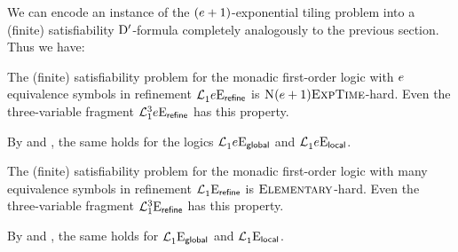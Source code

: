 We can encode an instance of the $(e+1)$-exponential tiling problem into a
(finite) satisfiability ${\mathrm{D'}}$-formula completely analogously to the previous
section. Thus we have:
\begin{proposition}
The (finite) satisfiability problem for the monadic first-order logic with
$e$ equivalence symbols in refinement $\mathcal{L}^{{}}_{1}{e}\mathrm{E}_{\mathsf{refine}}$ is
$\text{\normalfont{\scshape N}}(e+1)\text{\normalfont{\scshape ExpTime}}$-hard. Even the three-variable fragment
$\mathcal{L}^{3}_{1}{e}\mathrm{E}_{\mathsf{refine}}$ has this property.

By  and , the same
holds for the logics $\mathcal{L}^{{}}_{1}{e}\mathrm{E}_{\mathsf{global}}$ and
$\mathcal{L}^{{}}_{1}{e}\mathrm{E}_{\mathsf{local}}$.
\end{proposition}
\begin{proposition}
The (finite) satisfiability problem for the monadic first-order logic with many
equivalence symbols in refinement $\mathcal{L}^{{}}_{1}{{}}\mathrm{E}_{\mathsf{refine}}$ is
$\text{\normalfont{\scshape Elementary}}$-hard. Even the three-variable fragment
$\mathcal{L}^{3}_{1}{{}}\mathrm{E}_{\mathsf{refine}}$ has this property.

By  and , the same 
holds for $\mathcal{L}^{{}}_{1}{{}}\mathrm{E}_{\mathsf{global}}$ and
$\mathcal{L}^{{}}_{1}{{}}\mathrm{E}_{\mathsf{local}}$.
\end{proposition}